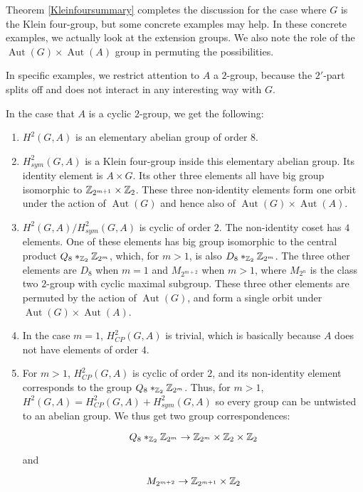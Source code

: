 \documentclass[10pt]{amsart}
\newcommand{\Aut}{\operatorname{Aut}}
\begin{document}
Theorem \ref{Kleinfoursummary} completes the discussion for the case
where $G$ is the Klein four-group, but some concrete examples may
help. In these concrete examples, we actually look at the extension
groups. We also note the role of the $\operatorname{Aut}(G) \times
\operatorname{Aut}(A)$ group in permuting the possibilities.

In specific examples, we restrict attention to $A$ a $2$-group,
because the $2'$-part splits off and does not interact in any
interesting way with $G$.

In the case that $A$ is a cyclic $2$-group, we get the following:

\begin{enumerate}
\item $H^2(G,A)$ is an elementary abelian group of order $8$.
\item $H^2_{sym}(G,A)$ is a Klein four-group inside this elementary
  abelian group. Its identity element is $A \times G$. Its other
  three elements all have big group isomorphic to $\mathbb{Z}_{2^{m+1}}
  \times \mathbb{Z}_2$. These three non-identity elements form one orbit
  under the action of $\Aut(G)$ and hence also of $\Aut(G) \times
  \Aut(A)$.
\item $H^2(G,A)/H^2_{sym}(G,A)$ is cyclic of order $2$. The
  non-identity coset has $4$ elements. One of these elements has big
  group isomorphic to the central product $Q_8 *_{\mathbb{Z}_2} \mathbb{Z}_{2^m}$,
  which, for $m > 1$, is also $D_8 *_{\mathbb{Z}_2} \mathbb{Z}_{2^m}$. The three other
  elements are $D_8$ when $m = 1$ and $M_{2^{m+2}}$ when $m > 1$,
  where $M_{2^n}$ is the class two $2$-group with cyclic maximal
  subgroup. These three other elements are permuted by the action of
  $\Aut(G)$, and form a single orbit under $\Aut(G) \times \Aut(A)$.
\item In the case $m = 1$, $H^2_{CP}(G,A)$ is trivial, which is
  basically because $A$ does not have elements of order $4$.
\item For $m > 1$, $H^2_{CP}(G,A)$ is cyclic of order $2$, and its
  non-identity element corresponds to the group $Q_8 *_{\mathbb{Z}_2}
  \mathbb{Z}_{2^m}$. Thus, for $m > 1$, $H^2(G,A) = H^2_{CP}(G,A) +
  H^2_{sym}(G,A)$ so every group can be untwisted to an abelian
  group. We thus get two group correspondences: 
    
  $$Q_8 *_{\mathbb{Z}_2} \mathbb{Z}_{2^m} \to \mathbb{Z}_{2^m} \times \mathbb{Z}_2 \times \mathbb{Z}_2$$
  
  and
  
  $$M_{2^{m + 2}} \to \mathbb{Z}_{2^{m+1}} \times \mathbb{Z}_2$$
\end{enumerate}
\end{document}
